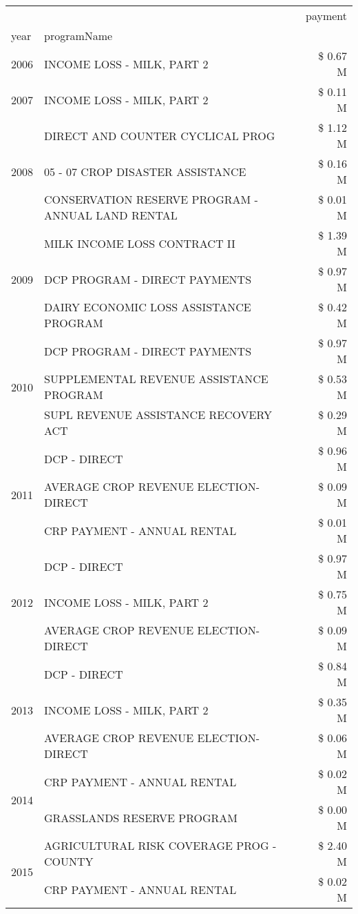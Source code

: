 \begin{tabular}{llr}
\toprule
 &  & payment \\
year & programName &  \\
\midrule
2006 & INCOME LOSS - MILK, PART 2 & \$ 0.67 M \\
\cline{1-3}
2007 & INCOME LOSS - MILK, PART 2 & \$ 0.11 M \\
\cline{1-3}
\multirow[t]{3}{*}{2008} & DIRECT AND COUNTER CYCLICAL PROG & \$ 1.12 M \\
 & 05 - 07 CROP DISASTER ASSISTANCE & \$ 0.16 M \\
 & CONSERVATION RESERVE PROGRAM - ANNUAL LAND RENTAL & \$ 0.01 M \\
\cline{1-3}
\multirow[t]{3}{*}{2009} & MILK INCOME LOSS CONTRACT II & \$ 1.39 M \\
 & DCP PROGRAM - DIRECT PAYMENTS & \$ 0.97 M \\
 & DAIRY ECONOMIC LOSS ASSISTANCE PROGRAM & \$ 0.42 M \\
\cline{1-3}
\multirow[t]{3}{*}{2010} & DCP PROGRAM - DIRECT PAYMENTS & \$ 0.97 M \\
 & SUPPLEMENTAL REVENUE ASSISTANCE PROGRAM & \$ 0.53 M \\
 & SUPL REVENUE ASSISTANCE RECOVERY ACT & \$ 0.29 M \\
\cline{1-3}
\multirow[t]{3}{*}{2011} & DCP - DIRECT & \$ 0.96 M \\
 & AVERAGE CROP REVENUE ELECTION-DIRECT & \$ 0.09 M \\
 & CRP PAYMENT - ANNUAL RENTAL & \$ 0.01 M \\
\cline{1-3}
\multirow[t]{3}{*}{2012} & DCP - DIRECT & \$ 0.97 M \\
 & INCOME LOSS - MILK, PART 2 & \$ 0.75 M \\
 & AVERAGE CROP REVENUE ELECTION-DIRECT & \$ 0.09 M \\
\cline{1-3}
\multirow[t]{3}{*}{2013} & DCP - DIRECT & \$ 0.84 M \\
 & INCOME LOSS - MILK, PART 2 & \$ 0.35 M \\
 & AVERAGE CROP REVENUE ELECTION-DIRECT & \$ 0.06 M \\
\cline{1-3}
\multirow[t]{2}{*}{2014} & CRP PAYMENT - ANNUAL RENTAL & \$ 0.02 M \\
 & GRASSLANDS RESERVE PROGRAM & \$ 0.00 M \\
\cline{1-3}
\multirow[t]{3}{*}{2015} & AGRICULTURAL RISK COVERAGE PROG - COUNTY & \$ 2.40 M \\
 & CRP PAYMENT - ANNUAL RENTAL & \$ 0.02 M \\

\end{tabular}
